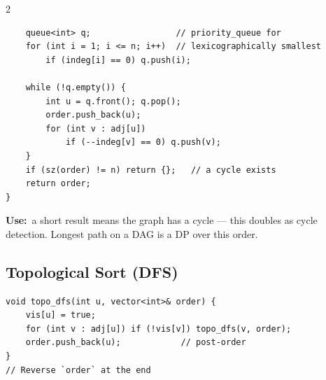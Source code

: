 \documentclass[10pt]{article}
\newcommand{\uses}[1]{{\color{accent2}\footnotesize\textbf{Use:}}~{\footnotesize #1}\par}
\begin{document}
\begin{multicols}{2}
\begin{lstlisting}
    queue<int> q;                 // priority_queue for
    for (int i = 1; i <= n; i++)  // lexicographically smallest
        if (indeg[i] == 0) q.push(i);

    while (!q.empty()) {
        int u = q.front(); q.pop();
        order.push_back(u);
        for (int v : adj[u])
            if (--indeg[v] == 0) q.push(v);
    }
    if (sz(order) != n) return {};   // a cycle exists
    return order;
}
\end{lstlisting}
\uses{a short result means the graph has a cycle --- this doubles as
cycle detection. Longest path on a DAG is a DP over this order.}

\subsection{Topological Sort (DFS)}
\begin{lstlisting}
void topo_dfs(int u, vector<int>& order) {
    vis[u] = true;
    for (int v : adj[u]) if (!vis[v]) topo_dfs(v, order);
    order.push_back(u);            // post-order
}
// Reverse `order` at the end
\end{lstlisting}

\end{multicols}

\end{document}
